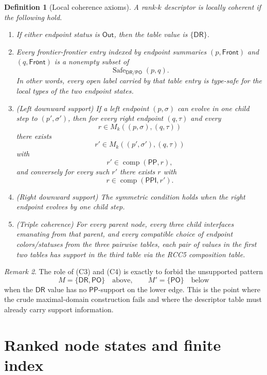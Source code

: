 \documentclass[11pt]{article}
\newtheorem{definition}{Definition}[section]
\theoremstyle{remark}
\newtheorem{remark}[definition]{Remark}
\newcommand{\DR}{\mathsf{DR}}
\newcommand{\PO}{\mathsf{PO}}
\newcommand{\PP}{\mathsf{PP}}
\newcommand{\PPI}{\mathsf{PPI}}
\newcommand{\comp}{\operatorname{comp}}
\newcommand{\Out}{\mathsf{Out}}
\newcommand{\Front}{\mathsf{Front}}
\begin{document}
\begin{definition}[Local coherence axioms]\label{def:coherence}
A rank-$k$ descriptor is \emph{locally coherent} if the following hold.
\begin{enumerate}[label=(C\arabic*)]
    \item If either endpoint status is $\Out$, then the table value is $\{\DR\}$.
    \item Every frontier-frontier entry indexed by endpoint summaries $(p,\Front)$ and $(q,\Front)$ is a nonempty subset of
    \[
    \operatorname{Safe}_{\DR/\PO}(p,q).
    \]
    In other words, every open label carried by that table entry is type-safe for the local types of the two endpoint states.
    \item (Left downward support) If a left endpoint $(p,\sigma)$ can evolve in one child step to $(p',\sigma')$, then for every right endpoint $(q,\tau)$ and every
    \[
    r\in M_k((p,\sigma),(q,\tau))
    \]
    there exists
    \[
    r'\in M_k((p',\sigma'),(q,\tau))
    \]
    with
    \[
    r'\in \comp(\PP,r),
    \]
    and conversely for every such $r'$ there exists $r$ with
    \[
    r\in \comp(\PPI,r').
    \]
    \item (Right downward support) The symmetric condition holds when the right endpoint evolves by one child step.
    \item (Triple coherence) For every parent node, every three child interfaces emanating from that parent, and every compatible choice of endpoint colors/statuses from the three pairwise tables, each pair of values in the first two tables has support in the third table via the RCC5 composition table.
\end{enumerate}
\end{definition}

\begin{remark}
The role of (C3) and (C4) is exactly to forbid the unsupported pattern
\[
M=\{\DR,\PO\}\quad\text{above},\qquad M'=\{\PO\}\quad\text{below}
\]
when the $\DR$ value has no $\PP$-support on the lower edge. This is the point where the crude maximal-domain construction fails and where the descriptor table must already carry support information.
\end{remark}

\section{Ranked node states and finite index}
\end{document}
